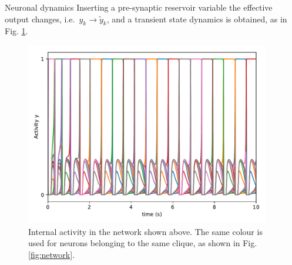 \documentclass[final,hyperref={pdfpagelabels=false}]{beamer}
\begin{document}
\begin{frame}
\begin{columns}
\begin{column}{.30\textwidth}
\begin{minipage}[T]{.95\textwidth}
{\begin{block}{Neuronal dynamics}
							Inserting a pre-synaptic reservoir variable the effective output changes, i.e.\ $y_k \rightarrow \tilde{y}_k$, and a transient state dynamics is obtained, as in Fig. \ref{fig:activity}.
							\begin{figure}
								\includegraphics[width=.7\linewidth]{double_activity}
								\caption{Internal activity in the network shown above. The same colour is used for neurons belonging to the same clique, as shown in Fig. \ref{fig:network}.}
								\label{fig:activity}
							\end{figure}
							
						\end{block}
						
						
						
						\vfill

					 } %
				\end{minipage}
		\end{column}
		\begin{column}{.64\textwidth}
				\begin{minipage}[T]{.95\textwidth}
					\parbox[t][\columnheight]{\textwidth}{

}
\end{minipage}
\end{column}
\end{columns}
\end{frame}
\end{document}

